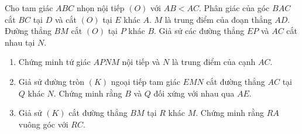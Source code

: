 \begin{ex}%
\hfill

	Cho tam giác $ABC$ nhọn nội tiếp $(O)$ với $AB < AC$. Phân giác của góc $BAC$ cắt $BC$ tại $D$ và cắt $(O)$ tại $E$ khác $A$. $M$ là trung điểm của đoạn thẳng $AD$. Đường thẳng $BM$ cắt $(O)$ tại $P$ khác $B$. Giả sử các đường thẳng $EP$ và $AC$ cắt nhau tại $N$.
    \begin{enumerate}
    \item Chứng minh tứ giác $APNM$ nội tiếp và $N$ là trung điểm của cạnh $AC$.
    \item Giả sử đường tròn $(K)$ ngoại tiếp tam giác $EMN$ cắt đường thẳng $AC$ tại $Q$ khác $N$. Chứng minh rằng $B$ và $Q$ đối xứng với nhau qua $AE$.
    \item Giả sử $(K)$ cắt đường thẳng $BM$ tại $R$ khác $M$. Chứng minh rằng $RA$ vuông góc với $RC$.
    \end{enumerate}
\end{ex}
